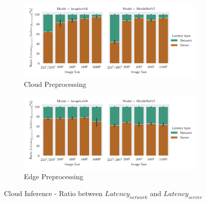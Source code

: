 \begin{figure}[H]
\centering
\begin{subfigure}[b]{0.95\textwidth}
   \includegraphics[width=1\linewidth]{./Bilder/single_plots/cloud_inference_plots/Cloud_ratio_server_total_latency_(cloud_prepro).pdf}
   \caption{Cloud Preprocessing}
   \label{fig:CloudInferenceratioCloud} 
\end{subfigure}

\begin{subfigure}[b]{0.95\textwidth}
   \includegraphics[width=1\linewidth]{./Bilder/single_plots/cloud_inference_plots/Cloud_ratio_server_total_latency_(edge_prepro).pdf}
   \caption{Edge Preprocessing}
   \label{fig:CloudInferenceRatioEdge}
\end{subfigure}

\caption{Cloud Inference -  Ratio between $Latency_{network}$ and $Latency_{server}$}
\end{figure}


